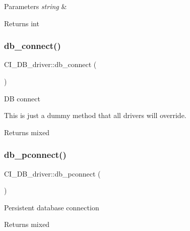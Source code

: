 \begin{DoxyParams}{Parameters}
{\em string} & \\
\hline
\end{DoxyParams}
\begin{DoxyReturn}{Returns}
int 
\end{DoxyReturn}
\mbox{\label{class_c_i___d_b__driver_adbc1be97e40e42af0f18c0474dc8d50b}} 
\subsubsection{\texorpdfstring{db\+\_\+connect()}{db\_connect()}}
{\footnotesize\ttfamily C\+I\+\_\+\+D\+B\+\_\+driver\+::db\+\_\+connect (\begin{DoxyParamCaption}{ }\end{DoxyParamCaption})}

DB connect

This is just a dummy method that all drivers will override.

\begin{DoxyReturn}{Returns}
mixed 
\end{DoxyReturn}
\mbox{\label{class_c_i___d_b__driver_a386d514dfbd21d07e2613ef6cfdbb912}} 
\subsubsection{\texorpdfstring{db\+\_\+pconnect()}{db\_pconnect()}}
{\footnotesize\ttfamily C\+I\+\_\+\+D\+B\+\_\+driver\+::db\+\_\+pconnect (\begin{DoxyParamCaption}{ }\end{DoxyParamCaption})}

Persistent database connection

\begin{DoxyReturn}{Returns}
mixed 
\end{DoxyReturn}
\mbox{\label{class_c_i___d_b__driver_af2b43875faa68762b65b6e5f84f45d19}} 
